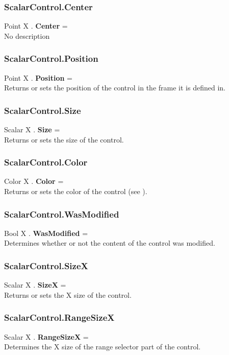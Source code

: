 \subsubsection{ScalarControl.Center \label{F:ScalarControl:Center}}
Point X . \textbf{Center} = \\
No description

\subsubsection{ScalarControl.Position \label{F:ScalarControl:Position}}
Point X . \textbf{Position} = \\
Returns or sets the position of the control in the frame it is defined in.

\subsubsection{ScalarControl.Size \label{F:ScalarControl:Size}}
Scalar X . \textbf{Size} = \\
Returns or sets the size of the control.

\subsubsection{ScalarControl.Color \label{F:ScalarControl:Color}}
Color X . \textbf{Color} = \\
Returns or sets the color of the control (see ).

\subsubsection{ScalarControl.WasModified \label{F:ScalarControl:WasModified}}
Bool X . \textbf{WasModified} = \\
Determines whether or not the content of the control was modified.

\subsubsection{ScalarControl.SizeX \label{F:ScalarControl:SizeX}}
Scalar X . \textbf{SizeX} = \\
Returns or sets the X size of the control.

\subsubsection{ScalarControl.RangeSizeX \label{F:ScalarControl:RangeSizeX}}
Scalar X . \textbf{RangeSizeX} = \\
Determines the X size of the range selector part of the control.

